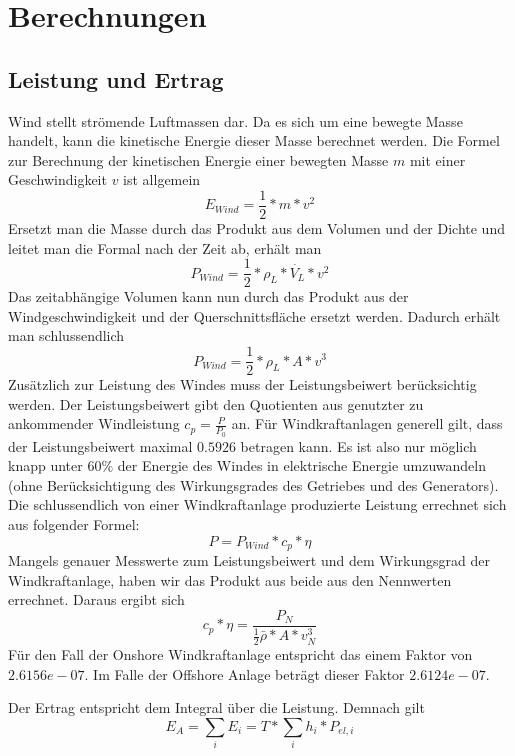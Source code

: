 \documentclass[a4paper,12pt]{article}
\begin{document}
	\newpage
	
	\section{Berechnungen}
	\subsection{Leistung und Ertrag}
	Wind stellt strömende Luftmassen dar. Da es sich um eine bewegte Masse handelt, kann die kinetische Energie dieser Masse berechnet werden.\newline
	Die Formel zur Berechnung der kinetischen Energie einer bewegten Masse $m$ mit einer Geschwindigkeit $v$ ist allgemein
	\begin{equation}
	E_{Wind} = \frac{1}{2}*m*v^2
	\end{equation}
	\noindent Ersetzt man die Masse durch das Produkt aus dem Volumen und der Dichte und leitet man die Formal nach der Zeit ab, erhält man
	\begin{equation}
	P_{Wind} = \frac{1}{2}*\rho_L*\dot{V_L}*v^2
	\end{equation}
	Das zeitabhängige Volumen kann nun durch das Produkt aus der Windgeschwindigkeit und der Querschnittsfläche ersetzt werden. Dadurch erhält man schlussendlich
	\begin{equation}
	P_{Wind} = \frac{1}{2}*\rho_L*A*v^3
	\end{equation}
	Zusätzlich zur Leistung des Windes muss der Leistungsbeiwert berücksichtig werden. Der Leistungsbeiwert gibt den Quotienten aus genutzter zu ankommender Windleistung $c_p = \frac{P}{P_0}$ an. Für Windkraftanlagen generell gilt, dass der Leistungsbeiwert maximal $0.5926$ betragen kann. Es ist also nur möglich knapp unter $60\%$ der Energie des Windes in elektrische Energie umzuwandeln (ohne Berücksichtigung des Wirkungsgrades des Getriebes und des Generators).\newline
	Die schlussendlich von einer Windkraftanlage produzierte Leistung errechnet sich aus folgender Formel:
	\begin{equation}
	P = P_{Wind}*c_p*\eta
	\end{equation}
	Mangels genauer Messwerte zum Leistungsbeiwert und dem Wirkungsgrad der Windkraftanlage, haben wir das Produkt aus beide aus den Nennwerten errechnet.\newline
	Daraus ergibt sich
	\begin{equation}
	c_p * \eta = \frac{P_N}{\frac{1}{2}\bar{\rho}*A*v_N^3}
	\end{equation}
	Für den Fall der Onshore Windkraftanlage entspricht das einem Faktor von $2.6156e-07$. Im Falle der Offshore Anlage beträgt dieser Faktor $2.6124e-07$.\\ \par
	Der Ertrag entspricht dem Integral über die Leistung. \newline Demnach gilt\begin{equation}
	E_A = \sum_{i} E_i = T * \sum_{i} h_i * P_{el, i}
	\end{equation}
\end{document}
